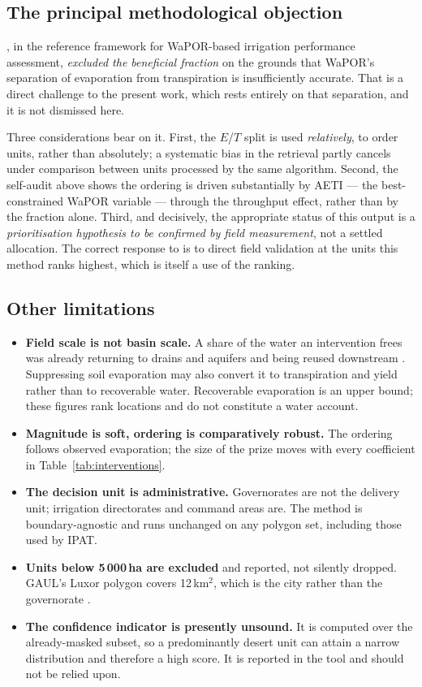 \documentclass[11pt,a4paper]{article}
\begin{document}
\subsection{The principal methodological objection}

\citet{chukalla2022}, in the reference framework for WaPOR-based irrigation
performance assessment, \emph{excluded the beneficial fraction} on the grounds
that WaPOR's separation of evaporation from transpiration is insufficiently
accurate. That is a direct challenge to the present work, which rests entirely on
that separation, and it is not dismissed here.

Three considerations bear on it. First, the $E$/$T$ split is used
\emph{relatively}, to order units, rather than absolutely; a systematic bias in
the retrieval partly cancels under comparison between units processed by the same
algorithm. Second, the self-audit above shows the ordering is driven
substantially by AETI --- the best-constrained WaPOR variable --- through the
throughput effect, rather than by the fraction alone. Third, and decisively, the
appropriate status of this output is a \emph{prioritisation hypothesis to be
confirmed by field measurement}, not a settled allocation. The correct response
to \citet{chukalla2022} is to direct field validation at the units this method
ranks highest, which is itself a use of the ranking.

\subsection{Other limitations}

\begin{itemize}
\item \textbf{Field scale is not basin scale.} A share of the water an
  intervention frees was already returning to drains and aquifers and being
  reused downstream \citep{perry2007,vanhalsema2012}. Suppressing soil
  evaporation may also convert it to transpiration and yield rather than to
  recoverable water. Recoverable evaporation is an upper bound; these figures
  rank locations and do not constitute a water account.
\item \textbf{Magnitude is soft, ordering is comparatively robust.} The ordering
  follows observed evaporation; the size of the prize moves with every
  coefficient in Table~\ref{tab:interventions}.
\item \textbf{The decision unit is administrative.} Governorates are not the
  delivery unit; irrigation directorates and command areas are. The method is
  boundary-agnostic and runs unchanged on any polygon set, including those used
  by IPAT.
\item \textbf{Units below 5\,000\,ha are excluded} and reported, not
  silently dropped. GAUL's Luxor polygon covers 12\,km$^2$,
  which is the city rather than the governorate \citep{gaul2015}.
\item \textbf{The confidence indicator is presently unsound.} It is computed over
  the already-masked subset, so a predominantly desert unit can attain a narrow
  distribution and therefore a high score. It is reported in the tool and should
  not be relied upon.
\end{itemize}
\end{document}
